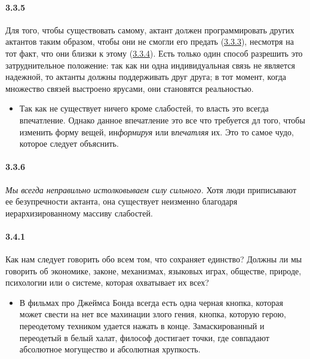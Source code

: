 \paragraph{3.3.5}\hypertarget{par:3.3.5}{} Для того, чтобы существовать самому, актант должен программировать других актантов таким образом, чтобы они не смогли его предать (\hyperlink{par:3.3.3}{3.3.3}), несмотря на тот факт, что они близки к этому (\hyperlink{par:3.3.4}{3.3.4}). Есть только один способ разрешить это затруднительное положение: так как ни одна индивидуальная связь не является надежной, то актанты должны поддерживать друг друга; в тот момент, когда множество связей выстроено ярусами, они становятся реальностью.
	\begin{itemize}
	\item 
	Так как не существует ничего кроме слабостей, то власть это всегда впечатление. Однако данное впечатление это все что требуется дл того, чтобы изменить форму вещей, ин{\itshape{формируя}} или в{\itshape{печатляя}} их. Это то самое чудо, которое следует объяснить.
	\end{itemize}

\paragraph{3.3.6}\hypertarget{par:3.3.6}{} {\itshape Мы всегда неправильно истолковываем силу сильного.} Хотя люди приписывают ее безупречности актанта, она существует неизменно благодаря иерархизированному массиву слабостей.


\paragraph{3.4.1}\hypertarget{par:3.4.1}{} Как нам следует говорить обо всем том, что сохраняет единство? Должны ли мы говорить об экономике, законе, механизмах, языковых играх, обществе, природе, психологии или о системе, которая охватывает их всех?
	\begin{itemize}
	\item 
	В фильмах про Джеймса Бонда всегда есть одна черная кнопка, которая может свести на нет все махинации злого гения, кнопка, которую герою, переодетому техником удается нажать в конце. Замаскированный и переодетый в белый халат, философ достигает точки, где совпадают абсолютное могущество и абсолютная хрупкость.
	\end{itemize}

